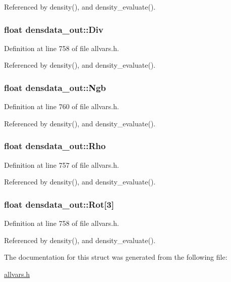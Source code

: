 Referenced by density(), and density\_\-evaluate().

\hypertarget{structdensdata__out_af3c2ce61474da5764ac1b50155c0aa7e}{
\subsubsection[{Div}]{\setlength{\rightskip}{0pt plus 5cm}float {\bf densdata\_\-out::Div}}}
\label{structdensdata__out_af3c2ce61474da5764ac1b50155c0aa7e}


Definition at line 758 of file allvars.h.



Referenced by density(), and density\_\-evaluate().

\hypertarget{structdensdata__out_ad78ddc3f9c8fb77b2e98f04d5cd2dfb4}{
\subsubsection[{Ngb}]{\setlength{\rightskip}{0pt plus 5cm}float {\bf densdata\_\-out::Ngb}}}
\label{structdensdata__out_ad78ddc3f9c8fb77b2e98f04d5cd2dfb4}


Definition at line 760 of file allvars.h.



Referenced by density(), and density\_\-evaluate().

\hypertarget{structdensdata__out_a7a4edc5de1283464a658fb089594d11c}{
\subsubsection[{Rho}]{\setlength{\rightskip}{0pt plus 5cm}float {\bf densdata\_\-out::Rho}}}
\label{structdensdata__out_a7a4edc5de1283464a658fb089594d11c}


Definition at line 757 of file allvars.h.



Referenced by density(), and density\_\-evaluate().

\hypertarget{structdensdata__out_a748be7d0e50757980389fb667d6d022b}{
\subsubsection[{Rot}]{\setlength{\rightskip}{0pt plus 5cm}float {\bf densdata\_\-out::Rot}\mbox{[}3\mbox{]}}}
\label{structdensdata__out_a748be7d0e50757980389fb667d6d022b}


Definition at line 758 of file allvars.h.



Referenced by density(), and density\_\-evaluate().



The documentation for this struct was generated from the following file:\begin{DoxyCompactItemize}
\item 
\hyperlink{allvars_8h}{allvars.h}\end{DoxyCompactItemize}
